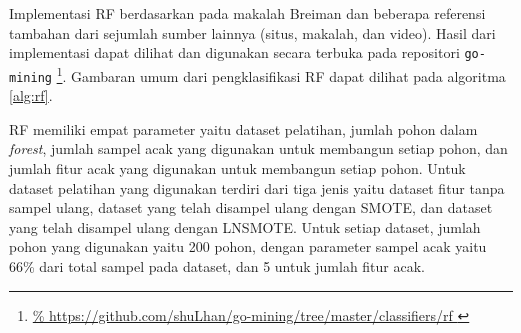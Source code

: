 Implementasi RF berdasarkan pada makalah Breiman \cite{breiman2001random}
dan beberapa referensi tambahan dari sejumlah sumber lainnya
(situs, makalah, dan video).
Hasil dari implementasi dapat dilihat dan digunakan secara terbuka pada
repositori \texttt{go-mining}
\footnote{
\url{%
https://github.com/shuLhan/go-mining/tree/master/classifiers/rf
}}.
Gambaran umum dari pengklasifikasi RF dapat dilihat pada algoritma
\ref{alg:rf}.

RF memiliki empat parameter yaitu dataset pelatihan, jumlah pohon dalam
\textit{forest}, jumlah sampel acak yang digunakan untuk membangun setiap
pohon, dan jumlah fitur acak yang digunakan untuk membangun setiap pohon.
Untuk dataset pelatihan yang digunakan terdiri dari tiga jenis yaitu
dataset fitur tanpa sampel ulang, dataset yang telah disampel ulang dengan
SMOTE, dan dataset yang telah disampel ulang dengan LNSMOTE.
Untuk setiap dataset, jumlah pohon yang digunakan yaitu 200 pohon, dengan
parameter sampel acak yaitu 66\% dari total sampel pada dataset, dan 5 untuk
jumlah fitur acak.
